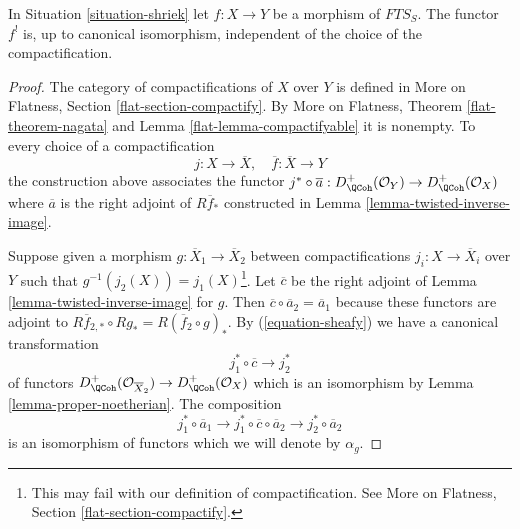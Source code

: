 %
\begin{lemma}
\label{lemma-shriek-well-defined}
In Situation \ref{situation-shriek} let $f : X \to Y$ be a morphism
of $\textit{FTS}_S$. The functor $f^!$ is, up to canonical isomorphism,
independent of the choice of the compactification.
\end{lemma}

\begin{proof}
The category of compactifications of $X$ over $Y$ is defined
in More on Flatness, Section \ref{flat-section-compactify}.
By More on Flatness, Theorem \ref{flat-theorem-nagata} and
Lemma \ref{flat-lemma-compactifyable} it is nonempty.
To every choice of a compactification
$$
j : X \to \overline{X},\quad \overline{f} : \overline{X} \to Y
$$
the construction above associates the functor $j^* \circ \overline{a} :
D_\QCoh^+(\mathcal{O}_Y) \to D_\QCoh^+(\mathcal{O}_X)$
where $\overline{a}$ is the right adjoint of $R\overline{f}_*$
constructed in Lemma \ref{lemma-twisted-inverse-image}.

\medskip\noindent
Suppose given a morphism $g : \overline{X}_1 \to \overline{X}_2$
between compactifications $j_i : X \to \overline{X}_i$ over $Y$
such that $g^{-1}(j_2(X)) = j_1(X)$\footnote{This may fail
with our definition of compactification. See
More on Flatness, Section \ref{flat-section-compactify}.}.
Let $\overline{c}$ be the right adjoint of
Lemma \ref{lemma-twisted-inverse-image} for $g$.
Then $\overline{c} \circ \overline{a}_2 = \overline{a}_1$
because these functors are adjoint to
$R\overline{f}_{2, *} \circ Rg_* = R(\overline{f}_2 \circ g)_*$.
By (\ref{equation-sheafy}) we have a canonical transformation
$$
j_1^* \circ \overline{c} \longrightarrow j_2^*
$$
of functors
$D^+_\QCoh(\mathcal{O}_{\overline{X}_2}) \to D^+_\QCoh(\mathcal{O}_X)$
which is an isomorphism by Lemma \ref{lemma-proper-noetherian}.
The composition
$$
j_1^* \circ \overline{a}_1 \longrightarrow
j_1^* \circ \overline{c} \circ \overline{a}_2 \longrightarrow
j_2^* \circ \overline{a}_2
$$
is an isomorphism of functors which we will denote by $\alpha_g$.


\end{proof}
